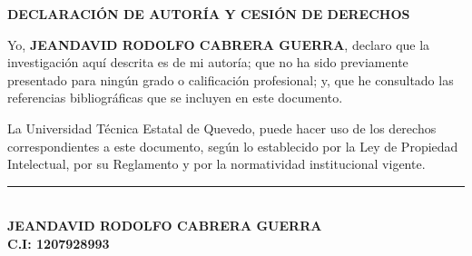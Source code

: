 \setcounter{page}{2}

\begin{center}
    \vspace*{0.5cm}
    {\bfseries DECLARACIÓN DE AUTORÍA Y CESIÓN DE DERECHOS}
\end{center}
\vspace{1cm}

\justifying
Yo, \textbf{JEANDAVID RODOLFO CABRERA GUERRA}, declaro que la investigación aquí descrita es de mi autoría; que no ha sido previamente presentado para ningún grado o calificación profesional; y, que he consultado las referencias bibliográficas que se incluyen en este documento.

\vspace{0.5cm}

La Universidad Técnica Estatal de Quevedo, puede hacer uso de los derechos correspondientes a este documento, según lo establecido por la Ley de Propiedad Intelectual, por su Reglamento y por la normatividad institucional vigente.

\vspace{4cm}

\begin{center}
    \rule{8cm}{0.4pt}\\[0.2cm]
    \textbf{JEANDAVID RODOLFO CABRERA GUERRA}\\
    \textbf{C.I: 1207928993}
\end{center}

\newpage
